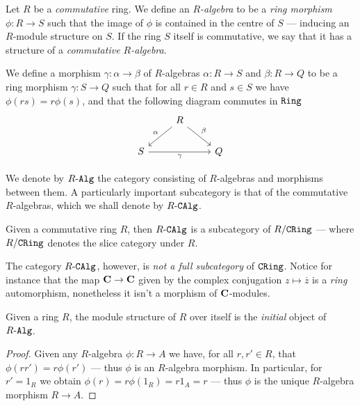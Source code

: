 \begin{definition}[\(R\)-algebra]
    \label{def:R-algebra}
    Let \(R\) be a \emph{commutative} ring. We define an \emph{\(R\)-algebra} to be
    a \emph{ring morphism} \(\phi: R \to S\) such that the image of \(\phi\) is
    contained in the centre of \(S\) --- inducing an \(R\)-module structure on
    \(S\). If the ring \(S\) itself is commutative, we say that it has a structure
    of a \emph{commutative \(R\)-algebra}.

    We define a morphism \(\gamma: \alpha \to \beta\) of \(R\)-algebras
    \(\alpha: R \to S\) and \(\beta: R \to Q\) to be a ring morphism
    \(\gamma: S \to Q\) such that for all \(r \in R\) and \(s \in S\) we have
    \(\phi(r s) = r \phi(s)\), and that the following diagram commutes in \({\texttt{Ring}}\)
    \[
        \begin{tikzcd}
            &R \ar[ld, "\alpha"'] \ar[rd, "\beta"] & \\
            S \ar[rr, "\gamma"']& &Q
        \end{tikzcd}
    \]

    We denote by \({R\text{-}\texttt{Alg}}\) the category consisting of \(R\)-algebras and morphisms
    between them. A particularly important subcategory is that of the commutative
    \(R\)-algebras, which we shall denote by \({R\text{-}\texttt{CAlg}}\).
\end{definition}

\begin{corollary}
    \label{cor:CAlg-subcat-CRing}
    Given a commutative ring \(R\), then \({R\text{-}\texttt{CAlg}}\) is a subcategory of
    \(R/{\texttt{CRing}}\) --- where \(R/{\texttt{CRing}}\) denotes the slice category under \(R\).
\end{corollary}

\begin{example}
    \label{exp:CAlg-not-full-subcat-CRing}
    The category \({R\text{-}\texttt{CAlg}}\), however, is \emph{not a full subcategory} of
    \({\texttt{CRing}}\). Notice for instance that the map \(\mathbf{C} \to \mathbf{C}\) given by
    the complex conjugation \(z \mapsto \overline{z}\) is a \emph{ring}
    automorphism, nonetheless it isn't a morphism of \(\mathbf{C}\)-modules.
\end{example}

\begin{proposition}
    \label{prop:R-initial-R-alg}
    Given a ring \(R\), the module structure of \(R\) over itself is the
    \emph{initial} object of \({R\text{-}\texttt{Alg}}\).
\end{proposition}

\begin{proof}
    Given any \(R\)-algebra \(\phi: R \to A\) we have, for all \(r, r' \in R\), that
    \(\phi(r r') = r \phi(r')\) --- thus \(\phi\) is an \(R\)-algebra morphism. In
    particular, for \(r' = 1_R\) we obtain \(\phi(r) = r \phi(1_R) = r 1_A = r\) ---
    thus \(\phi\) is the unique \(R\)-algebra morphism \(R \to A\).
\end{proof}

